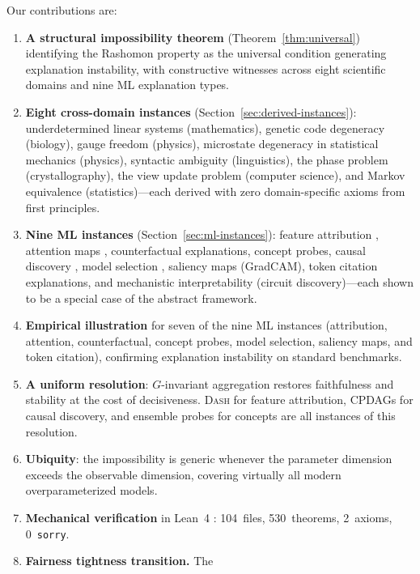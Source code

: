 \documentclass[11pt,a4paper]{article}
\newcommand{\DASH}{\textsc{Dash}}
\begin{document}
Our contributions are:
\begin{enumerate}[label=(\arabic*)]
  \item \textbf{A structural impossibility theorem}
    (Theorem~\ref{thm:universal}) identifying the Rashomon property
    as the universal condition generating explanation instability,
    with constructive witnesses across eight scientific domains and
    nine ML explanation types.
  \item \textbf{Eight cross-domain instances}
    (Section~\ref{sec:derived-instances}): underdetermined linear systems
    (mathematics), genetic code degeneracy (biology), gauge freedom
    (physics), microstate degeneracy in statistical mechanics (physics),
    syntactic ambiguity (linguistics), the phase problem
    (crystallography), the view update problem (computer science), and
    Markov equivalence (statistics)---each derived with zero domain-specific axioms from
    first principles.
  \item \textbf{Nine ML instances}
    (Section~\ref{sec:ml-instances}): feature attribution
    \citep{bilodeau2024impossibility}, attention maps
    \citep{jainwallace2019}, counterfactual explanations, concept probes,
    causal discovery \citep{verma1991equivalence}, model selection
    \citep{rudin2024amazing}, saliency maps (GradCAM), token citation explanations,
    and mechanistic interpretability (circuit
    discovery)---each shown to be a special case of the abstract framework.
  \item \textbf{Empirical illustration} for seven of the nine ML instances
    (attribution, attention, counterfactual, concept probes, model selection, saliency maps, and token citation),
    confirming explanation instability on standard benchmarks.
  \item \textbf{A uniform resolution}: $G$-invariant aggregation restores
    faithfulness and stability at the cost of decisiveness.  \DASH{} for
    feature attribution, CPDAGs for causal discovery, and ensemble probes
    for concepts are all instances of this resolution.
  \item \textbf{Ubiquity}: the impossibility is generic whenever the
    parameter dimension exceeds the observable dimension, covering
    virtually all modern overparameterized models.
  \item \textbf{Mechanical verification} in Lean~4
    \citep{demoura2021lean4}: 104~files, 530~theorems, 2~axioms,
    0~\texttt{sorry}.
  \item \textbf{Fairness tightness transition.}  The

\end{enumerate}
\end{document}
